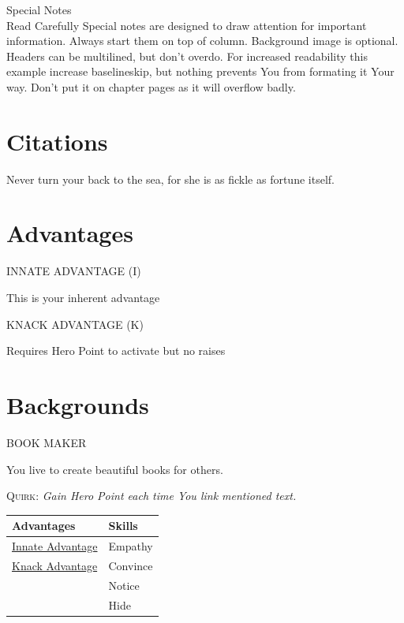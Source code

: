 \documentclass[10pt,a4paper,twoside,twocolumn,openany]{book}
\newcommand{\BGHeader}[1]{%
				\begin{bgbox}\noindent\large\textsc{\MakeUppercase{#1}}\end{bgbox}%
			}
\newcommand{\Quirk}[2]{\medskip\noindent\textsc{#1}: \textit{#2}}
\begin{document}
    
    
    \newpage
\begin{SpecialNotes}{Special Notes \\ Read Carefully}
	\setlength{\baselineskip}{1.4\baselineskip}%
	Special notes are designed to draw attention for important information.
	Always start them on top of column. Background image is optional.
	Headers can be multilined, but don't overdo. For increased readability 
	this example increase baselineskip, but nothing prevents You from formating it Your way. Don't put it on chapter pages as it will overflow badly.
		\setlength{\baselineskip}{1\baselineskip}%
			
\end{SpecialNotes}
    
    \section{Citations}

    \begin{Citation}{Never turn your back to the sea, for she is as fickle as fortune itself.}
    \end{Citation}

    \section{Advantages}
    \hypertarget{a:innateadvantage}{\BGHeader{Innate Advantage (I)}}
    This is your inherent advantage
    
    \hypertarget{a:knackadvantage}{\BGHeader{Knack Advantage (K)}}
    Requires Hero Point to activate but no raises
    
    \newpage
    \section{Backgrounds}
    \BGHeader{Book Maker} 
    \noindent You live to create beautiful books for others.
    
    \Quirk{Quirk}{Gain Hero Point each time You link mentioned text.}

    
    \begin{table}[h]
        \centering
        \renewcommand{\arraystretch}{1.2} %
        \begin{tabular}{p{} p{}} %
            \textbf{Advantages} & \textbf{Skills} \\
            \hline
            \hyperlink{a:innateadvantage}{Innate Advantage} & Empathy \\
            \hyperlink{a:knackadvantage}{Knack Advantage} & Convince \\
            & Notice \\
            & Hide \\
            \hline
        \end{tabular}
    \end{table}
    
\end{document}
